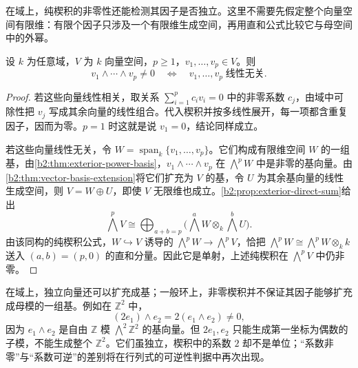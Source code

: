 \ProseParagraphBreak
在域上，纯楔积的非零性还能检测其因子是否独立。这里不需要先假定整个向量空间有限维：有限个因子只涉及一个有限维生成空间，再用直和公式比较它与母空间中的外幂。

\begin{proposition}\label{b2:prop:wedge-linear-independence}
	设 \(k\) 为任意域，\(V\) 为 \(k\) 向量空间，\(p\ge1\)，\(v_1,\ldots,v_p\in V\)。则
	\[
		v_1\wedge\cdots\wedge v_p\ne0 \quad\Longleftrightarrow\quad v_1,\ldots,v_p\;\text{线性无关}.
	\]
\end{proposition}
\begin{proof}
	若这些向量线性相关，取关系 \(\sum_{i=1}^p c_iv_i=0\) 中的非零系数 \(c_j\)，由域中可除性把 \(v_j\) 写成其余向量的线性组合。代入楔积并按多线性展开，每一项都含重复因子，因而为零。\(p=1\) 时这就是说 \(v_1=0\)，结论同样成立。

	若这些向量线性无关，令 \(W=\operatorname{span}_k\{v_1,\ldots,v_p\}\)。它们构成有限维空间 \(W\) 的一组基，由\cref{b2:thm:exterior-power-basis}，\(v_1\wedge\cdots\wedge v_p\) 在 \(\bigwedge^pW\) 中是非零的基向量。由\cref{b2:thm:vector-basis-extension}将它们扩充为 \(V\) 的基，令 \(U\) 为其余基向量的线性生成空间，则 \(V=W\oplus U\)，即使 \(V\) 无限维也成立。\cref{b2:prop:exterior-direct-sum}给出
	\[
		\bigwedge^pV\cong \bigoplus_{a+b=p}\bigl(\bigwedge^aW\otimes_k\bigwedge^bU\bigr).
	\]
	由该同构的纯楔积公式，\(W\hookrightarrow V\) 诱导的 \(\bigwedge^pW\rightarrow\bigwedge^pV\)，恰把 \(\bigwedge^pW\cong\bigwedge^pW\otimes_k k\) 送入 \((a,b)=(p,0)\) 的直和分量。因此它是单射，上述纯楔积在 \(\bigwedge^pV\) 中仍非零。
\end{proof}

在域上，独立向量还可以扩充成基；一般环上，非零楔积并不保证其因子能够扩充成母模的一组基。例如在 \(\mathbb Z^2\) 中，
\[
	(2e_1)\wedge e_2=2(e_1\wedge e_2)\ne0,
\]
因为 \(e_1\wedge e_2\) 是自由 \(\mathbb Z\) 模 \(\bigwedge^2\mathbb Z^2\) 的基向量。但 \(2e_1,e_2\) 只能生成第一坐标为偶数的子模，不能生成整个 \(\mathbb Z^2\)。它们虽独立，楔积中的系数 \(2\) 却不是单位；“系数非零”与“系数可逆”的差别将在行列式的可逆性判据中再次出现。
